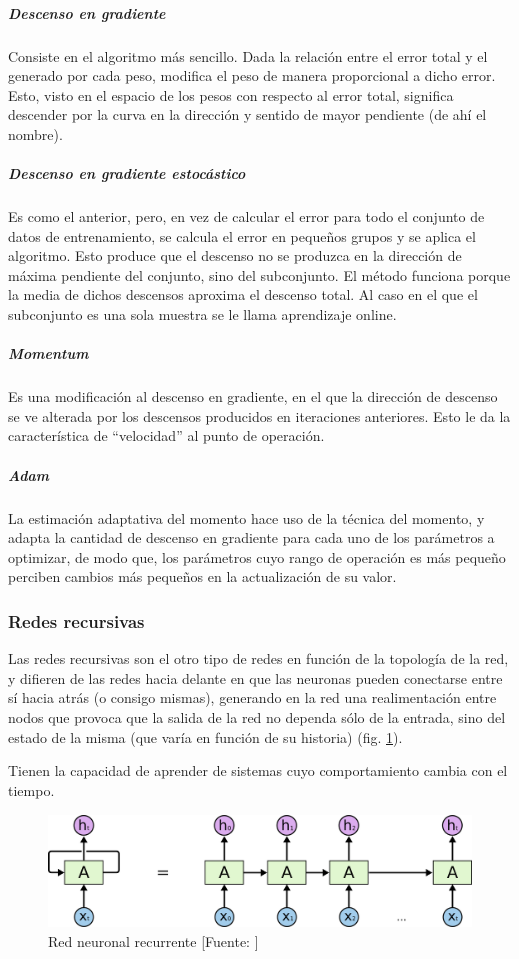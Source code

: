 \subparagraph{Descenso en gradiente}
Consiste en el algoritmo más sencillo. Dada la relación entre el error total y el generado por cada peso, modifica el peso de manera proporcional a dicho error. Esto, visto en el espacio de los pesos con respecto al error total, significa descender por la curva en la dirección y sentido de mayor pendiente (de ahí el nombre).
\subparagraph{Descenso en gradiente estocástico}
Es como el anterior, pero, en vez de calcular el error para todo el conjunto de datos de entrenamiento, se calcula el error en pequeños grupos y se aplica el algoritmo. Esto produce que el descenso no se produzca en la dirección de máxima pendiente del conjunto, sino del subconjunto. El método funciona porque la media de dichos descensos aproxima el descenso total. Al caso en el que el subconjunto es una sola muestra se le llama aprendizaje online.
\subparagraph{Momentum}
Es una modificación al descenso en gradiente, en el que la dirección de descenso se ve alterada por los descensos producidos en iteraciones anteriores. Esto le da la característica de ``velocidad'' al punto de operación.
\subparagraph{Adam}
La estimación adaptativa del momento hace uso de la técnica del momento, y adapta la cantidad de descenso en gradiente para cada uno de los parámetros a optimizar, de modo que, los parámetros cuyo rango de operación es más pequeño perciben cambios más pequeños en la actualización de su valor.

\subsubsection{Redes recursivas}
\label{subsubsec:metodos/recursivas}
Las redes recursivas \cite{karpathy} son el otro tipo de redes en función de la topología de la red, y difieren de las redes hacia delante en que las neuronas pueden conectarse entre sí hacia atrás (o consigo mismas), generando en la red una realimentación entre nodos que provoca que la salida de la red no dependa sólo de la entrada, sino del estado de la misma (que varía en función de su historia) (fig. \ref{fig:metodos/rnn}).

Tienen la capacidad de aprender de sistemas cuyo comportamiento cambia con el tiempo.
\begin{figure}
	\centering
	\includegraphics[height=3cm]{imagenes/metodos/rnn.png}
	\caption{Red neuronal recurrente [Fuente: \cite{colah}]}
	\label{fig:metodos/rnn}
\end{figure}
